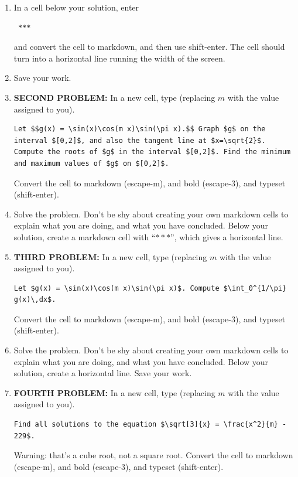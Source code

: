 \documentclass[12pt,answers]{book}
\begin{document}
\begin{enumerate}
  \item In a cell below your solution, enter \begin{verbatim} *** \end{verbatim} and convert the cell to markdown, and then use shift-enter. The cell should turn into a horizontal line running the width of the screen.
  \item Save your work.
  \item {\bf SECOND PROBLEM:} In a new cell, type (replacing $m$ with the value assigned to you).
  \begin{lstlisting}[breaklines]
    Let $$g(x) = \sin(x)\cos(m x)\sin(\pi x).$$ Graph $g$ on the interval $[0,2]$, and also the tangent line at $x=\sqrt{2}$. Compute the roots of $g$ in the interval $[0,2]$. Find the minimum and maximum values of $g$ on $[0,2]$.
  \end{lstlisting}
  Convert the cell to markdown (escape-m), and bold (escape-3), and typeset (shift-enter).

  \item Solve the problem. Don't be shy about creating your own markdown cells to explain what you are doing, and what you have concluded. Below your solution, create a markdown cell with ``{$***$}'', which gives a horizontal line.

  \item {\bf THIRD PROBLEM:}  In a new cell, type (replacing $m$ with the value assigned to you).
  \begin{lstlisting}[breaklines]
    Let $g(x) = \sin(x)\cos(m x)\sin(\pi x)$. Compute $\int_0^{1/\pi} g(x)\,dx$.
  \end{lstlisting}
  Convert the cell to markdown (escape-m), and bold (escape-3), and typeset (shift-enter).

  \item Solve the problem. Don't be shy about creating your own markdown cells to explain what you are doing, and what you have concluded. Below your solution, create a horizontal line. Save your work.


  \item {\bf FOURTH PROBLEM:}  In a new cell, type (replacing $m$ with the value assigned to you).
  \begin{lstlisting}[breaklines]
    Find all solutions to the equation $\sqrt[3]{x} = \frac{x^2}{m} - 229$.
  \end{lstlisting}
  Warning: that's a cube root, not a square root. Convert the cell to markdown (escape-m), and bold (escape-3), and typeset (shift-enter).


\end{enumerate}
\end{document}
